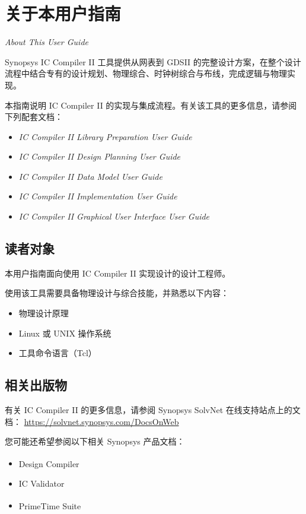 \chapter*{关于本用户指南}

\noindent\textit{About This User Guide}

Synopsys IC Compiler II 工具提供从网表到 GDSII 的完整设计方案，在整个设计流程中结合专有的设计规划、物理综合、时钟树综合与布线，完成逻辑与物理实现。

本指南说明 IC Compiler II 的实现与集成流程。有关该工具的更多信息，请参阅下列配套文档：
\begin{itemize}
  \item \textit{IC Compiler II Library Preparation User Guide}
  \item \textit{IC Compiler II Design Planning User Guide}
  \item \textit{IC Compiler II Data Model User Guide}
  \item \textit{IC Compiler II Implementation User Guide}
  \item \textit{IC Compiler II Graphical User Interface User Guide}
\end{itemize}

\section*{读者对象}

本用户指南面向使用 IC Compiler II 实现设计的设计工程师。

使用该工具需要具备物理设计与综合技能，并熟悉以下内容：
\begin{itemize}
  \item 物理设计原理
  \item Linux 或 UNIX 操作系统
  \item 工具命令语言（Tcl）
\end{itemize}

\section*{相关出版物}

有关 IC Compiler II 的更多信息，请参阅 Synopsys SolvNet 在线支持站点上的文档：
\url{https://solvnet.synopsys.com/DocsOnWeb}

您可能还希望参阅以下相关 Synopsys 产品文档：
\begin{itemize}
  \item Design Compiler\textsuperscript{\textregistered}
  \item IC Validator
  \item PrimeTime\textsuperscript{\textregistered} Suite
\end{itemize}

